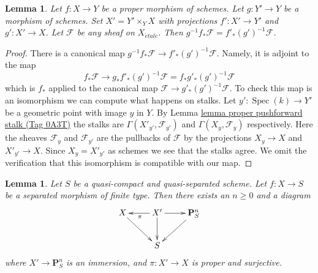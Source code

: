 \documentclass{amsart}
\theoremstyle{plain}
\newtheorem{lemma}[subsection]{Lemma}
\theoremstyle{definition}
\theoremstyle{remark}
\numberwithin{equation}{subsection}
\def\Spec{\mathop{\mathrm{Spec}}}
\def\etale{{\acute{e}tale}}
\begin{document}
\begin{lemma}
\label{lemma-proper-base-change-f-star}
Let $f : X \to Y$ be a proper morphism of schemes. Let $g : Y' \to Y$
be a morphism of schemes. Set $X' = Y' \times_Y X$ with projections
$f' : X' \to Y'$ and $g' : X' \to X$. Let $\mathcal{F}$ be any sheaf on
$X_\etale$. Then $g^{-1}f_*\mathcal{F} = f'_*(g')^{-1}\mathcal{F}$.
\end{lemma}

\begin{proof}
There is a canonical map $g^{-1}f_*\mathcal{F} \to f'_*(g')^{-1}\mathcal{F}$.
Namely, it is adjoint to the map
$$
f_*\mathcal{F} \longrightarrow
g_*f'_*(g')^{-1}\mathcal{F} = f_*g'_*(g')^{-1}\mathcal{F}
$$
which is $f_*$ applied to the canonical map
$\mathcal{F} \to g'_*(g')^{-1}\mathcal{F}$. To check this map is an
isomorphism we can compute what happens on stalks.
Let $y' : \Spec(k) \to Y'$ be a geometric point with image $y$ in $Y$.
By Lemma \href{https://stacks.math.columbia.edu/tag/0A3T}{lemma proper pushforward stalk (Tag 0A3T)} the stalks are
$\Gamma(X'_{y'}, \mathcal{F}_{y'})$ and $\Gamma(X_y, \mathcal{F}_y)$
respectively. Here the sheaves $\mathcal{F}_y$ and $\mathcal{F}_{y'}$
are the pullbacks of $\mathcal{F}$ by the projections $X_y \to X$
and $X'_{y'} \to X$. Since $X_y = X'_{y'}$ as schemes
we see that the stalks agree. We omit the
verification that this isomorphism is compatible with our map.
\end{proof}


\begin{lemma}
\label{limits-lemma-chow-finite-type}
Let $S$ be a quasi-compact and quasi-separated scheme.
Let $f : X \to S$ be a separated morphism of finite type.
Then there exists an $n \geq 0$ and a diagram
$$
\xymatrix{
X \ar[rd] & X' \ar[d] \ar[l]^\pi \ar[r] & \mathbf{P}^n_S \ar[dl] \\
& S &
}
$$
where $X' \to \mathbf{P}^n_S$ is an immersion, and
$\pi : X' \to X$ is proper and surjective.
\end{lemma}
\end{document}
